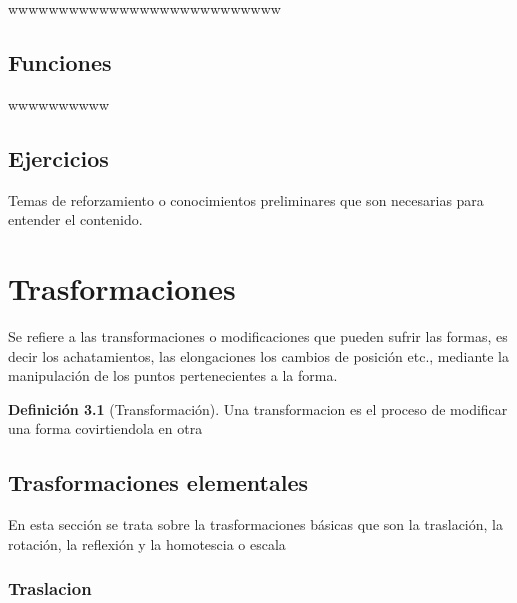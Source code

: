 \documentclass[16pt,]{krantz}
\theoremstyle{definition}
\newtheorem{definition}{Definición}[chapter]
\theoremstyle{definition}
\theoremstyle{definition}
\theoremstyle{definition}
\theoremstyle{remark}
\begin{document}
wwwwwwwwwwwwwwwwwwwwwwwwwww

\hypertarget{funciones}{%
\section{Funciones}\label{funciones}}

wwwwwwwwww \citep{vincze2014college}

\hypertarget{ejercicios-1}{%
\section{Ejercicios}\label{ejercicios-1}}

\hypertarget{appendix-apendice}{%
\appendix {}}


Temas de reforzamiento o conocimientos preliminares que son necesarias para entender el contenido.

\hypertarget{trasformaciones}{%
\chapter{Trasformaciones}\label{trasformaciones}}

Se refiere a las transformaciones o modificaciones que pueden sufrir las formas, es decir los achatamientos, las elongaciones los cambios de posición etc., mediante la manipulación de los puntos pertenecientes a la forma.

\begin{definition}[Transformación]
\protect\hypertarget{def:transformacion}{}{\label{def:transformacion} {} }Una transformacion es el proceso de modificar una forma covirtiendola en otra
\end{definition}

\hypertarget{trasformaciones-elementales}{%
\section{Trasformaciones elementales}\label{trasformaciones-elementales}}

En esta sección se trata sobre la trasformaciones básicas que son la traslación, la rotación, la reflexión y la homotescia o escala

\hypertarget{traslacion}{%
\subsection{Traslacion}\label{traslacion}}
\end{document}
